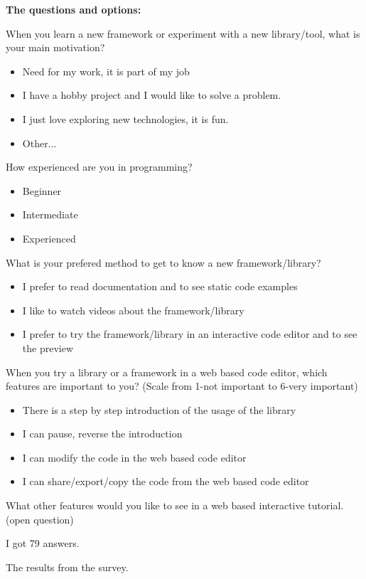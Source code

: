 \documentclass[12pt, a4paper, oneside, openright, medskipamount]{report}
\begin{document}
\textbf{The questions and options:}

\noindent When you learn a new framework or experiment with a new library/tool, what is your main motivation?
\begin{itemize}[noitemsep]
\item Need for my work, it is part of my job
\item I have a hobby project and I would like to solve a problem.
\item I just love exploring new technologies, it is fun.
\item Other...
\end{itemize}

\noindent How experienced are you in programming?
\begin{itemize}[noitemsep]
\item Beginner
\item Intermediate
\item Experienced
\end{itemize}

\noindent What is your prefered method to get to know a new framework/library?
\begin{itemize}[noitemsep]
\item I prefer to read documentation and to see static code examples
\item I like to watch videos about the framework/library
\item I prefer to try the framework/library in an interactive code editor and to see the preview
\end{itemize}

\noindent When you try a library or a framework in a web based code editor, which features are important to you? (Scale from 1-not important to 6-very important)
\begin{itemize}[noitemsep]
\item There is a step by step introduction of the usage of the library
\item I can pause, reverse the introduction
\item I can modify the code in the web based code editor
\item I can share/export/copy the code from the web based code editor
\end{itemize}

What other features would you like to see in a web based interactive tutorial.
(open question)

I got 79 answers.

The results from the survey.
\end{document}
